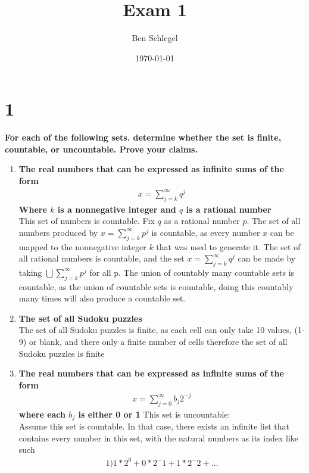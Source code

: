 \documentclass{article}
\author{Ben Schlegel
}
\title{Exam 1}
\date{\today}
\begin{document}
\maketitle

\section* {1}
\noindent \textbf{For each of the following sets. determine whether the set is finite, countable, or uncountable. Prove your claims.}
\begin{enumerate}[label=\textbf{\alph*)}]
    \item \textbf{The real numbers that can be expressed as infinite sums of the form} 
    \begin{align*}
        x = \sum^{\infty}_{j=k} q^j
    \end{align*}
    \textbf{Where $k$ is a nonnegative integer and $q$ is a rational number}\\
    This set of numbers is countable. Fix $q$ as a rational number $p$. The set of all numbers produced by $x = \sum^{\infty}_{j=k} p^j$ is countable, as every number $x$ can be mapped to the nonnegative integer $k$ that was used to generate it. The set of all rational numbers is countable, and the set $x = \sum^{\infty}_{j=k} q^j$ can be made by taking $\bigcup \sum^{\infty}_{j=k} p^j$ for all p. The union of countably many countable sets is countable, as the union of countable sets is countable, doing this countably many times will also produce a countable set.
    \item \textbf{The set of all Sudoku puzzles}\\
    The set of all Sudoku puzzles is finite, as each cell can only take 10 values, (1-9) or blank, and there only a finite number of cells therefore the set of all Sudoku puzzles is finite\\ 
    \item \textbf{The real numbers that can be expressed as infinite sums of the form} \begin{align*}
        x = \sum^{\infty}_{j=0} b_j 2^{-j}
    \end{align*}
    \textbf{where each $b_j$ is either 0 or 1}
    This set is uncountable:\\
    Assume this set is countable. In that case, there exists an infinite list that contains every number in this set, with the natural numbers as its index like such
    \begin{align*}
        \text{1)} 1*2^0 + 0*2^-1 + 1*2^-2+\dots\\

\end{align*}
\end{enumerate}
\end{document}
